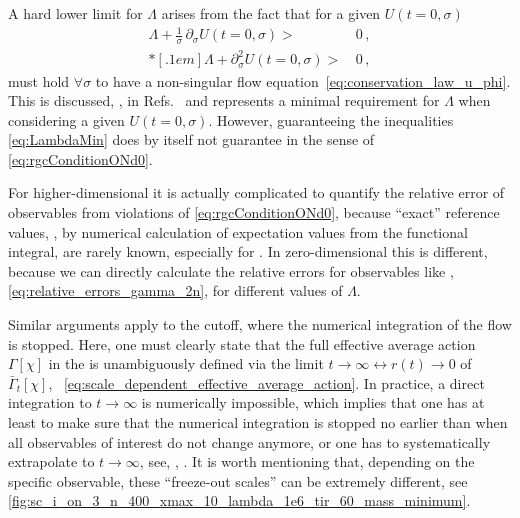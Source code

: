 A hard lower limit for $\Lambda$ arises from the fact that for a given \ic{} $U(t=0,\sigma)$
\begin{subequations}\label{eq:LambdaMin}
\begin{align}
	\Lambda + \tfrac{1}{\sigma} \, \partial_\sigma U( t = 0, \sigma ) > \, & 0 \, ,	\label{eq:LambdaMin1}\\*[.1em] %
	\Lambda + \partial_\sigma^2 U( t = 0, \sigma ) > \, & 0 \, ,\label{eq:LambdaMin2}
\end{align}
\end{subequations}
must hold $\forall\sigma$ to have a non-singular flow equation~\eqref{eq:conservation_law_u_phi}. 
This is discussed, \eg{}, in Refs.~\cite{Pelaez:2015nsa,Schaefer:2001cn} and represents a minimal requirement for $\Lambda$ when considering a given \ic{} $U(t=0,\sigma)$.
However, guaranteeing the inequalities \eqref{eq:LambdaMin} does by itself \apriori{} not guarantee \rgcy{} in the sense of \cref{eq:rgcConditionONd0}.

For higher-dimensional \qfts{} it is actually complicated to quantify the relative error of observables from violations of \cref{eq:rgcConditionONd0}, because ``exact'' reference values, \eg{}, by numerical calculation of expectation values from the functional integral, are rarely known, especially for \loefts{}.
In zero-dimensional \qft{} this is different, because we can directly calculate the relative errors for observables like \ipi{} \nptFunctions{}, \cf{} \cref{eq:relative_errors_gamma_2n}, for different values of $\Lambda$.

Similar arguments apply to the \ir{} cutoff, where the numerical integration of the \frg{} flow is stopped.
Here, one must clearly state that the full effective average action $\Gamma [ \chi ]$ in the \ir{} is unambiguously defined via the limit ${t \rightarrow \infty \leftrightarrow r(t) \rightarrow 0}$ of $\bar{\Gamma}_t [ \chi ]$, \cf{}\ \cref{eq:scale_dependent_effective_average_action}.
In practice, a direct integration to $t \rightarrow \infty$ is numerically impossible, which implies that one has at least to make sure that the numerical \rgtime{} integration is stopped no earlier than when all observables of interest do not change anymore, or one has to systematically extrapolate to $t \rightarrow \infty$, see, \eg{}, .
It is worth mentioning that, depending on the specific observable, these ``freeze-out scales'' can be extremely different, see \cref{fig:sc_i_on_3_n_400_xmax_10_lambda_1e6_tir_60_mass_minimum}.\bigskip

